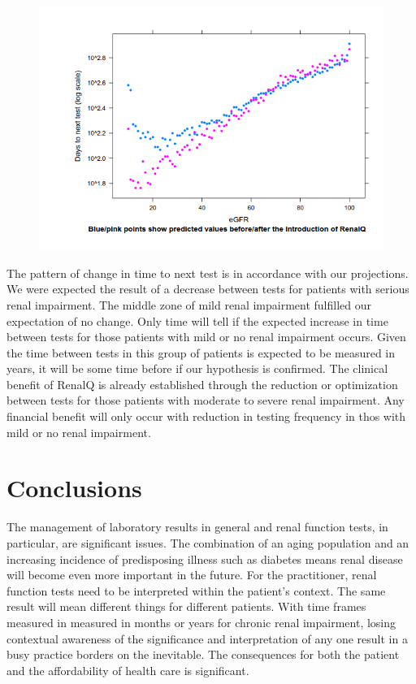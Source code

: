 \documentclass[11pt]{article}
\begin{document}
\begin{figure}[htp]
\centering
\includegraphics[scale=0.50]{FigCritical.png}
\caption{}
\label{}
\end{figure}

The pattern of change in time to next test is in accordance with our projections. We were expected the result of a decrease between tests for patients with serious renal impairment. The middle zone of mild renal impairment fulfilled our expectation of no change. Only time will tell if the expected increase in time between tests for those patients with mild or no renal impairment occurs. Given the time between tests in this group of patients is expected to be measured in years, it will be some time before if our hypothesis is confirmed. The clinical benefit of RenalQ is already established through the reduction or optimization between tests for those patients with moderate to severe renal impairment. Any financial benefit will only occur with reduction in testing frequency in thos with mild or no renal impairment.

\section{Conclusions}
The management of laboratory results in general and renal function tests, in particular, are significant issues. The combination of an aging population and an increasing incidence of predisposing illness such as diabetes means renal disease will become even more important in the future. For the practitioner, renal function tests need to be interpreted within the patient's context. The same result will mean different things for different patients. With time frames measured in measured in months or years for chronic renal impairment, losing contextual awareness of the significance and interpretation of any one result in a busy practice borders on the inevitable. The consequences for both the patient and the affordability of health care is significant.\\
\end{document}
